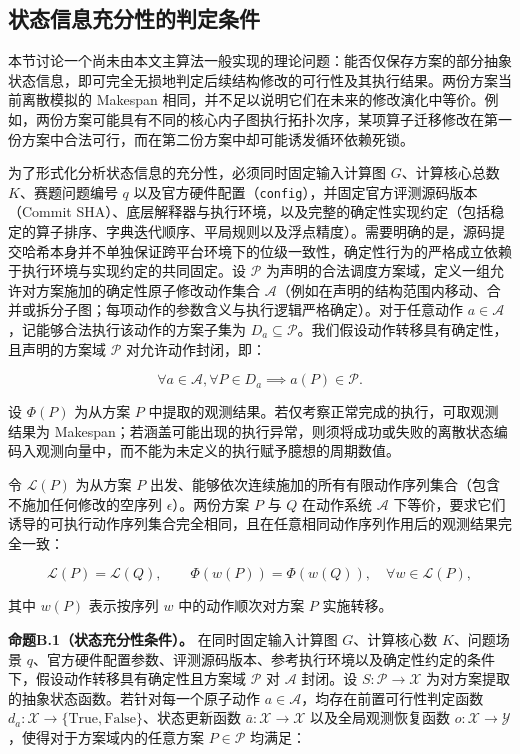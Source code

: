 \documentclass[anonymous,withtoc]{gmcm2026}
\begin{document}
\subsection{状态信息充分性的判定条件}

本节讨论一个尚未由本文主算法一般实现的理论问题：能否仅保存方案的部分抽象状态信息，即可完全无损地判定后续结构修改的可行性及其执行结果。两份方案当前离散模拟的 Makespan 相同，并不足以说明它们在未来的修改演化中等价。例如，两份方案可能具有不同的核心内子图执行拓扑次序，某项算子迁移修改在第一份方案中合法可行，而在第二份方案中却可能诱发循环依赖死锁。

为了形式化分析状态信息的充分性，必须同时固定输入计算图 \(G\)、计算核心总数 \(K\)、赛题问题编号 \(q\) 以及官方硬件配置（\texttt{config}），并固定官方评测源码版本（Commit SHA）、底层解释器与执行环境，以及完整的确定性实现约定（包括稳定的算子排序、字典迭代顺序、平局规则以及浮点精度）。需要明确的是，源码提交哈希本身并不单独保证跨平台环境下的位级一致性，确定性行为的严格成立依赖于执行环境与实现约定的共同固定。设 \(\mathcal{P}\) 为声明的合法调度方案域，定义一组允许对方案施加的确定性原子修改动作集合 \(\mathcal{A}\)（例如在声明的结构范围内移动、合并或拆分子图；每项动作的参数含义与执行逻辑严格确定）。对于任意动作 \(a \in \mathcal{A}\)，记能够合法执行该动作的方案子集为 \(D_a \subseteq \mathcal{P}\)。我们假设动作转移具有确定性，且声明的方案域 \(\mathcal{P}\) 对允许动作封闭，即：

\begin{equation}
\forall a \in \mathcal{A}, \forall P \in D_a \implies a(P) \in \mathcal{P}.
\end{equation}

设 \(\Phi(P)\) 为从方案 \(P\) 中提取的观测结果。若仅考察正常完成的执行，可取观测结果为 Makespan；若涵盖可能出现的执行异常，则须将成功或失败的离散状态编码入观测向量中，而不能为未定义的执行赋予臆想的周期数值。

令 \(\mathcal{L}(P)\) 为从方案 \(P\) 出发、能够依次连续施加的所有有限动作序列集合（包含不施加任何修改的空序列 \(\epsilon\)）。两份方案 \(P\) 与 \(Q\) 在动作系统 \(\mathcal{A}\) 下等价，要求它们诱导的可执行动作序列集合完全相同，且在任意相同动作序列作用后的观测结果完全一致：

\begin{equation}
\mathcal{L}(P) = \mathcal{L}(Q), \qquad \Phi(w(P)) = \Phi(w(Q)), \quad \forall w \in \mathcal{L}(P),
\end{equation}

其中 \(w(P)\) 表示按序列 \(w\) 中的动作顺次对方案 \(P\) 实施转移。

\textbf{命题B.1（状态充分性条件）。} 在同时固定输入计算图 \(G\)、计算核心数 \(K\)、问题场景 \(q\)、官方硬件配置参数、评测源码版本、参考执行环境以及确定性约定的条件下，假设动作转移具有确定性且方案域 \(\mathcal{P}\) 对 \(\mathcal{A}\) 封闭。设 \(S: \mathcal{P} \to \mathcal{X}\) 为对方案提取的抽象状态函数。若针对每一个原子动作 \(a \in \mathcal{A}\)，均存在前置可行性判定函数 \(d_a: \mathcal{X} \to \{\text{True}, \text{False}\}\)、状态更新函数 \(\bar{a}: \mathcal{X} \to \mathcal{X}\) 以及全局观测恢复函数 \(o: \mathcal{X} \to \mathcal{Y}\)，使得对于方案域内的任意方案 \(P \in \mathcal{P}\) 均满足：
\end{document}
